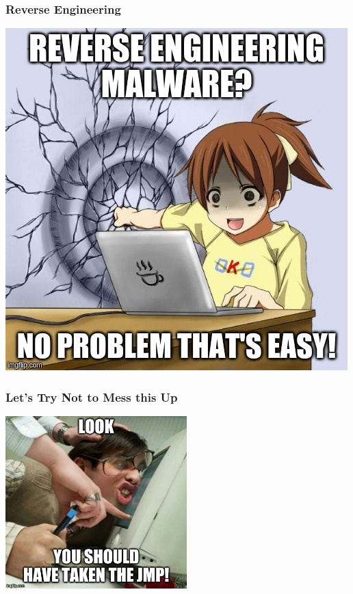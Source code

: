 \documentclass[aspectratio=169]{beamer}
\begin{document}
\begin{frame}
  \frametitle{Reverse Engineering}
  \begin{center}
    \includegraphics[scale=0.4]{reverse-engineering}
  \end{center}
\end{frame}

\begin{frame}
  \frametitle{Let's Try Not to Mess this Up}
  \begin{center}
    \includegraphics[width=7cm]{jmp-meme}
  \end{center}
\end{frame}
\end{document}
